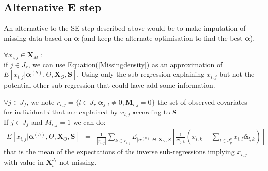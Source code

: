 \documentclass[12pt,a4paper]{report}
\begin{document}
\subsection{Alternative E step}
	An alternative to the SE step described above would be to make imputation of missing data based on $\boldsymbol{\alpha}$ (and keep the alternate optimisation to find the best $\boldsymbol{\alpha}$). 
	
	$\forall x_{i,j} \in \boldsymbol{X}_M $ :
	\\
if $j\in J_r$, we can use Equation(\ref{Missingdensity}) as an approximation of $E[x_{i,j}|\boldsymbol{\alpha}^{(h)},\Theta,\boldsymbol{X}_O,\boldsymbol{S}]$. Using only the sub-regression explaining $x_{i,j}$ but not the potential other sub-regression that could have add some information.
	  
	$\forall j \in J_f$, we note $r_{i,j}=\{l \in J_r|\bar{ \boldsymbol{\alpha}}_{j,l}\neq 0, \boldsymbol{M}_{i,j}=0 \}$ the set of observed covariates for individual $i$ that are explained by $x_{i,j}$ according to $\boldsymbol{S}$.
	\\
	If $j\in J_f$ and $M_{i,j}=1$ we can do:
	\begin{eqnarray}
	E[x_{i,j}|\boldsymbol{\alpha}^{(h)},\Theta,\boldsymbol{X}_O,\boldsymbol{S}]%
	&=& \frac{1}{|r_{i,j}|}\sum_{k \in r_{i,j}}E_{|\boldsymbol{\alpha}^{(h)},\Theta,\boldsymbol{X}_O,S}\left[\frac{1}{\bar{\boldsymbol{\alpha}}_{j,k}}\left(x_{i,k}- \sum_{l \in J_p^k} x_{i,l}\bar{\boldsymbol{\alpha}}_{l,k}\right)\right]
	\end{eqnarray}
	that is the mean of the expectations of the inverse sub-regressions implying $x_{i,j}$ with value in $\boldsymbol{X}^{J_r}_i$ not missing.
\end{document}
